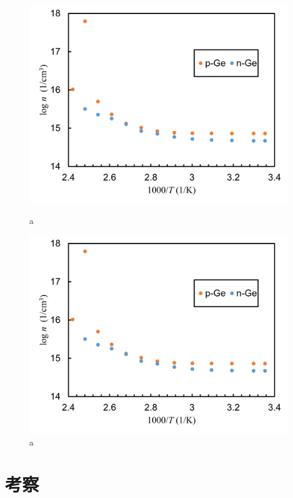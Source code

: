 \documentclass[11pt,dvipdfmx,a4paper]{jsarticle}
\numberwithin{equation}{section}
\begin{document}
\begin{figure}[h]
	\begin{minipage}{0.49\columnwidth}
		\centering
		\includegraphics[width=\columnwidth]{graph/graph08.png}
		\caption{a}
		\label{graph:07}
	\end{minipage}
	\hfil
	\begin{minipage}{0.49\columnwidth}
		\centering
		\includegraphics[width=\columnwidth]{graph/graph08.png}
		\caption{a}
		\label{graph:08}
	\end{minipage}
\end{figure}

\clearpage
\section{考察}
\end{document}
